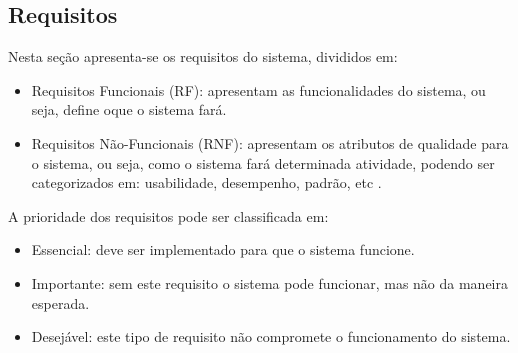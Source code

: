 \subsection{Requisitos}

Nesta se\c{c}\~ao apresenta-se os requisitos do sistema, divididos em:
\begin{itemize}
	
	\item  Requisitos Funcionais (RF): apresentam as funcionalidades do sistema, ou seja, define oque o sistema far\'a. 
	
	\item Requisitos N\~ao-Funcionais (RNF): apresentam os atributos de qualidade para o sistema, ou seja, como o sistema far\'a determinada atividade, podendo ser categorizados em: usabilidade, desempenho, padr\~ao, etc \cite{Ventura2016}. 
	
\end{itemize}

A prioridade dos requisitos pode ser classificada em: 

\begin{itemize}
	
	\item Essencial: deve ser implementado para que o sistema funcione. 

	\item Importante: sem este requisito o sistema pode funcionar, mas n\~ao da maneira esperada.
	
	\item Desej\'avel: este tipo de requisito n\~ao compromete o funcionamento do sistema.
	
\end{itemize}

